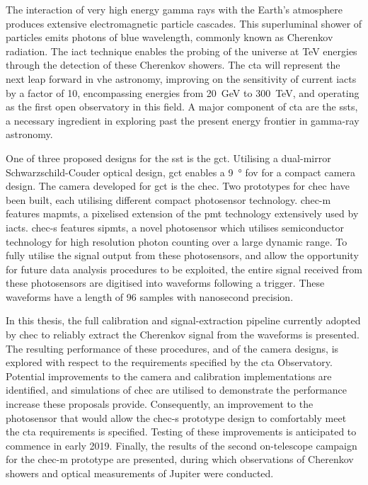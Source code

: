 The interaction of very high energy gamma rays with the Earth's atmosphere produces extensive electromagnetic particle cascades. This superluminal shower of particles emits photons of blue wavelength, commonly known as Cherenkov radiation. The \gls{iact} technique enables the probing of the universe at \si{TeV} energies through the detection of these Cherenkov showers. The \gls{cta} will represent the next leap forward in \gls{vhe} astronomy, improving on the sensitivity of current \glspl{iact} by a factor of 10, encompassing energies from \SI{20}{GeV} to \SI{300}{TeV}, and operating as the first open observatory in this field. A major component of \gls{cta} are the \glspl{sst}, a necessary ingredient in exploring past the present energy frontier in gamma-ray astronomy.

One of three proposed designs for the \gls{sst} is the \gls{gct}. Utilising a dual-mirror Schwarzschild-Couder optical design, \gls{gct} enables a \SI{9}{\degree} \gls{fov} for a compact camera design. The camera developed for \gls{gct} is the \gls{chec}. Two prototypes for \gls{chec} have been built, each utilising different compact photosensor technology. \gls{chec-m} features \glspl{mapmt}, a pixelised extension of the \gls{pmt} technology extensively used by \glspl{iact}. \mbox{\gls{chec-s}} features \glspl{sipmt}, a novel photosensor which utilises semiconductor technology for high resolution photon counting over a large dynamic range. To fully utilise the signal output from these photosensors, and allow the opportunity for future data analysis procedures to be exploited, the entire signal received from these photosensors are digitised into waveforms following a trigger. These waveforms have a length of 96 samples with nanosecond precision.

In this thesis, the full calibration and signal-extraction pipeline currently adopted by \gls{chec} to reliably extract the Cherenkov signal from the waveforms is presented. The resulting performance of these procedures, and of the camera designs, is explored with respect to the requirements specified by the \gls{cta} Observatory. Potential improvements to the camera and calibration implementations are identified, and simulations of \gls{chec} are utilised to demonstrate the performance increase these proposals provide. Consequently, an improvement to the photosensor that would allow the \gls{chec-s} prototype design to comfortably meet the \gls{cta} requirements is specified. Testing of these improvements is anticipated to commence in early 2019. Finally, the results of the second on-telescope campaign for the \gls{chec-m} prototype are presented, during which observations of Cherenkov showers and optical measurements of Jupiter were conducted.